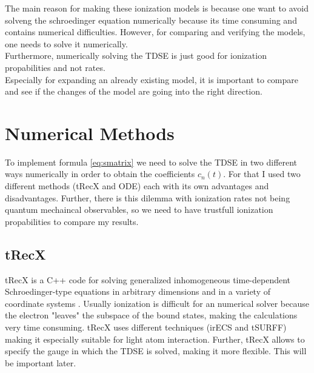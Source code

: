 The main reason for making these ionization models is because one want to avoid solveng the schroedinger equation numerically because its time consuming and contains numerical difficulties.
However, for comparing and verifying the models, one needs to solve it numerically.\\
Furthermore, numerically solving the TDSE is just good for ionization propabilities and not rates.\\
Especially for expanding an already existing model, it is important to compare and see if the changes of the model are going into the right direction.



\section{Numerical Methods}
To implement formula \ref{eq:smatrix} we need to solve the TDSE in two different ways numerically in order to obtain the coefficients $c_n(t)$. 
For that I used two different methods (tRecX and ODE) each with its own advantages and disadvantages.
Further, there is this dilemma with ionization rates not being quantum mechaincal observables, so we need to have trustfull ionization propabilities to compare my results.



\subsection{tRecX}
tRecX is a C++ code for solving generalized inhomogeneous time-dependent
Schroedinger-type equations in arbitrary dimensions and in a variety of coordinate systems \cite{Scrinzi_trecx}.
Usually ionization is difficult for an numerical solver because the electron "leaves" the subspace of the bound states, making the calculations very time consuming.
tRecX uses different techniques (irECS and tSURFF) making it especially suitable for light atom interaction. 
Further, tRecX allows to specify the gauge in which the TDSE is solved, making it more flexible. 
This will be important later.

